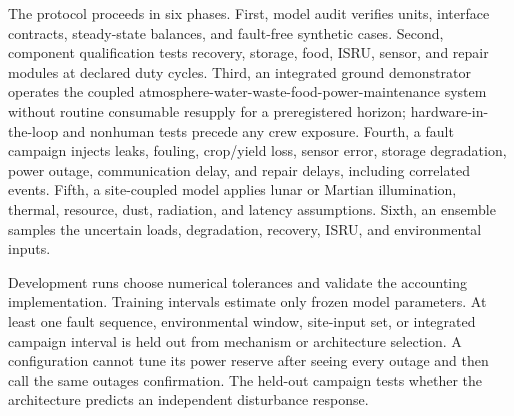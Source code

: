 \documentclass[10pt,conference]{IEEEtran}
\begin{document}
The protocol proceeds in six phases. First, model audit verifies units, interface contracts, steady-state balances, and fault-free synthetic cases. Second, component qualification tests recovery, storage, food, ISRU, sensor, and repair modules at declared duty cycles. Third, an integrated ground demonstrator operates the coupled atmosphere-water-waste-food-power-maintenance system without routine consumable resupply for a preregistered horizon; hardware-in-the-loop and nonhuman tests precede any crew exposure. Fourth, a fault campaign injects leaks, fouling, crop/yield loss, sensor error, storage degradation, power outage, communication delay, and repair delays, including correlated events. Fifth, a site-coupled model applies lunar or Martian illumination, thermal, resource, dust, radiation, and latency assumptions. Sixth, an ensemble samples the uncertain loads, degradation, recovery, ISRU, and environmental inputs.

Development runs choose numerical tolerances and validate the accounting implementation. Training intervals estimate only frozen model parameters. At least one fault sequence, environmental window, site-input set, or integrated campaign interval is held out from mechanism or architecture selection. A configuration cannot tune its power reserve after seeing every outage and then call the same outages confirmation. The held-out campaign tests whether the architecture predicts an independent disturbance response.
\end{document}
